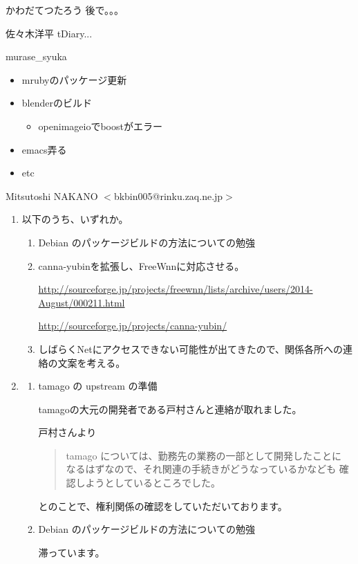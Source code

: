 \documentclass[mingoth,a4paper]{jsarticle}
\begin{document}
\begin{prework}{ かわだてつたろう }
後で。。。
\end{prework}

\begin{prework}{ 佐々木洋平 }
tDiary...
\end{prework}

\begin{prework}{ murase\_{}syuka }
  \begin{itemize}
  \item mrubyのパッケージ更新
  \item blenderのビルド
    \begin{itemize}
    \item openimageioでboostがエラー
    \end{itemize}
  \item emacs弄る
  \item etc
  \end{itemize}
\end{prework}

\begin{prework}{ Mitsutoshi NAKANO $<$bkbin005@rinku.zaq.ne.jp$>$ }
  \begin{enumerate}
  \item 以下のうち、いずれか。
    \begin{enumerate}
    \item Debian のパッケージビルドの方法についての勉強
    \item canna-yubinを拡張し、FreeWnnに対応させる。

      \url{http://sourceforge.jp/projects/freewnn/lists/archive/users/2014-August/000211.html}

      \url{http://sourceforge.jp/projects/canna-yubin/}
    \item しばらくNetにアクセスできない可能性が出てきたので、関係各所への連絡の文案を考える。
    \end{enumerate}
  \item
    \begin{enumerate}
    \item tamago の upstream の準備

      tamagoの大元の開発者である戸村さんと連絡が取れました。

      戸村さんより

      \begin{quote}
      tamago については、勤務先の業務の一部として開発したことに
      なるはずなので、それ関連の手続きがどうなっているかなども
      確認しようとしているところでした。
      \end{quote}

      とのことで、権利関係の確認をしていただいております。

    \item Debian のパッケージビルドの方法についての勉強

      滞っています。
    \end{enumerate}
  \end{enumerate}
\end{prework}
\end{document}
